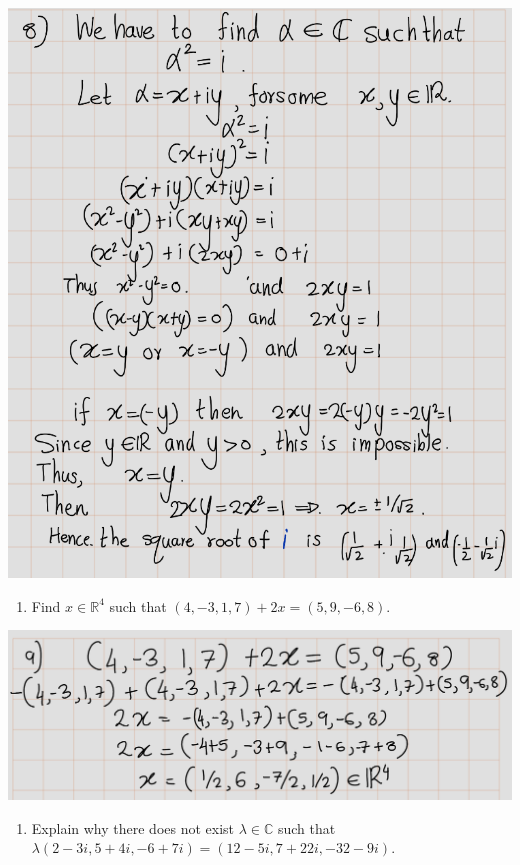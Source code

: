 \documentclass[
]{book}
\providecommand{\tightlist}{%
  \setlength{\itemsep}{0pt}\setlength{\parskip}{0pt}}
\theoremstyle{definition}
\theoremstyle{definition}
\theoremstyle{definition}
\theoremstyle{definition}
\theoremstyle{remark}
\begin{document}
\includegraphics[width=10.28in]{fig/Ex1A/Ex8}

\begin{enumerate}
\def\labelenumi{\arabic{enumi}.}
\setcounter{enumi}{8}
\tightlist
\item
  Find \(x \in \mathbb{R}^4\) such that \((4, -3, 1, 7) + 2x = (5, 9, -6, 8)\).
\end{enumerate}

\includegraphics[width=23.12in]{fig/Ex1A/Ex9}

\begin{enumerate}
\def\labelenumi{\arabic{enumi}.}
\setcounter{enumi}{9}
\tightlist
\item
  Explain why there does not exist \(\lambda \in \mathbb{C}\) such that \(\lambda(2 - 3i, 5 + 4i, -6 + 7i) = (12 - 5i, 7 + 22i, -32 - 9i)\).
\end{enumerate}
\end{document}

